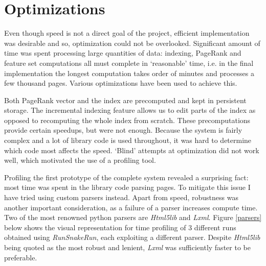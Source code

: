 \documentclass[12pt,notitlepage,twoside]{scrreprt}
\begin{document}
\section{Optimizations}

Even though speed is not a direct goal of the project, efficient implementation
was desirable and so, optimization could not be overlooked. Significant
amount of time was spent processing large quantities of data: indexing, PageRank
and feature set computations all must complete in `reasonable' time, i.e. in the
final implementation the longest computation takes order of minutes and
processes a few thousand pages. Various optimizations have been used to achieve
this. 

Both PageRank vector and the index are precomputed and kept in
persistent storage. The incremental indexing feature allows us to edit parts of the
index as opposed to recomputing the whole index from scratch. These
precomputations provide certain speedups, but were not enough.  Because the
system is fairly complex and a lot of library code is used throughout, it was
hard to determine which code most affects the speed. `Blind' attempts at
optimization did not work well, which motivated the use of a profiling tool.

Profiling the first prototype of the complete system revealed a surprising
fact: most time was spent in the library code parsing pages. To mitigate this
issue I have tried using custom parsers instead. Apart from speed, robustness
was another important consideration, as a failure of a parser increases compute
time. Two of the most renowned python parsers are \textit{Html5lib} and
\textit{Lxml}. Figure
\ref{parsers} below shows the visual representation for time profiling of 3
different runs obtained using \textit{RunSnakeRun}, each exploiting a
different parser.  Despite \textit{Html5lib} being quoted as the most
robust and lenient, \textit{Lxml} was sufficiently faster to be preferable.
\end{document}

